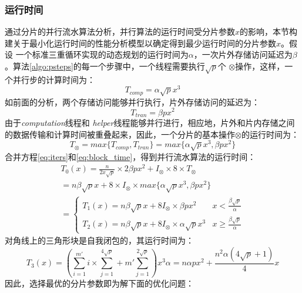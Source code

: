 \begin{flushleft}
\subsubsection{运行时间}
通过分片的并行流水算法分析，并行算法的运行时间受分片参数$x$的影响，本节构建关于最小化运行时间的性能分析模型以确定得到最少运行时间的分片参数$x$。假设
一个标准三重循环实现的动态规划的运行时间为$\alpha$，一次片外存储访问延迟为$\beta$。算法\ref{algo:psteps}的每一个步骤中，一个线程需要执行$\sqrt{p}$个
$\otimes$操作，这样，一个并行步的计算时间为：
\begin{displaymath}
T_{comp} = \alpha\sqrt{p}x^{3}
\end{displaymath}
如前面的分析，两个存储访问能够并行执行，片外存储访问的延迟为：
\begin{displaymath}
T_{tran} = \beta px^{2}
\end{displaymath}
由于{\em computation}线程和{\em
	helper}线程能够并行进行，相应地，片外和片内存储之间的数据传输和计算时间被重叠起来，因此，一个分片的基本操作$\otimes$的运行时间为：
\begin{equation}\label{eq:block_time}
T_{\otimes}=max\{T_{comp}, T_{tran}\}=max\{\alpha\sqrt{p}x^{3},\beta px^{2}\}
\end{equation}
合并方程\ref{eq:iters}和\ref{eq:block_time}，得到并行流水算法的运行时间：
\begin{equation}\label{eq:execution}
\begin{array}{ll}
T_{0}(x) = \frac{n}{2x\sqrt{p}}\times2\beta px^{2}+I_{\otimes}\times 8\times T_{\otimes}\\
=n\beta\sqrt{p}x+8\times I_{\otimes}\times max\{\alpha\sqrt{p}x^{3},\beta px^{2}\}\\
=\left\{ \begin{array}{ll} T_{1}(x)=n\beta\sqrt{p}x+8I_{\otimes}\times\beta px^{2} &
\textrm{$x<\frac{\beta\sqrt{p}}{\alpha}$}\\
T_{2}(x)=n\beta\sqrt{p}x+8I_{\otimes}\times\alpha\sqrt{p}x^{3} & \textrm{$x\ge\frac{\beta\sqrt{p}}{\alpha}$}
\end{array} \right.
\end{array}
\end{equation}
对角线上的三角形块是自我闭包的，其运行时间为：
\begin{equation}\label{eq:tri}
T_{3}(x)=(\sum_{i=1}^{m'}i\times\sum_{j=1}^{4\sqrt{p}}+m'\sum_{j=1}^{2\sqrt{p}})x^{3}\alpha =n\alpha
px^{2}+\frac{n^{2}\alpha(4\sqrt{p}+1)}{4}x
\end{equation}
因此，选择最优的分片参数即为解下面的优化问题：
\begin{equation}\label{eq:all}

\end{equation}
\end{flushleft}
